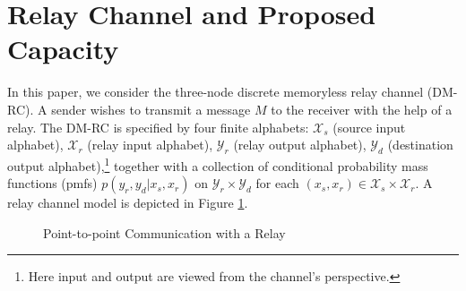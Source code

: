 \documentclass[12pt]{article}
\theoremstyle{definition}
\begin{document}
\section{Relay Channel and Proposed Capacity} \label{sec: relay channel}
In this paper, we consider the three-node discrete memoryless relay channel (DM-RC). A sender wishes to transmit a message $M$ to the receiver with the help of a relay. The DM-RC is specified by four finite alphabets: $\mathcal X_s$ (source input alphabet), $\mathcal X_r$ (relay input alphabet), $\mathcal Y_r$ (relay output alphabet), $\mathcal Y_d$ (destination output alphabet),\footnote{Here input and output are viewed from the channel's perspective.} together with a collection of conditional probability mass functions (pmfs) $p(y_r, y_d|x_s, x_r)$ on $\mathcal Y_r \times \mathcal Y_d$ for each $(x_s, x_r) \in \mathcal X_s \times \mathcal X_r$. A relay channel model is depicted in Figure \ref{fig:relay-channel}.

\begin{figure}[t]
    \centering
    \caption{Point-to-point Communication with a Relay}
    \label{fig:relay-channel}
\end{figure}
\end{document}
